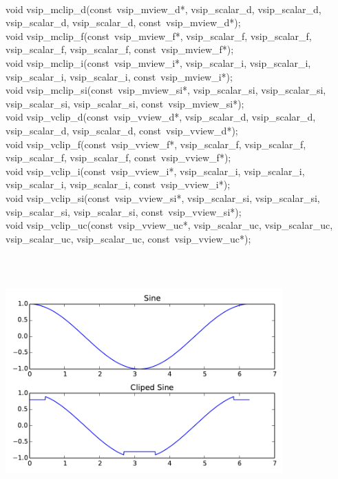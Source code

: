 \\\cvsiplh
\begin{cfuncs}
void vsip\_mclip\_d(const~vsip\_mview\_d*, vsip\_scalar\_d, vsip\_scalar\_d, vsip\_scalar\_d, vsip\_scalar\_d, const~vsip\_mview\_d*);\Bs\\
void vsip\_mclip\_f(const~vsip\_mview\_f*, vsip\_scalar\_f, vsip\_scalar\_f, vsip\_scalar\_f, vsip\_scalar\_f, const~vsip\_mview\_f*);\Bs\\
void vsip\_mclip\_i(const~vsip\_mview\_i*, vsip\_scalar\_i, vsip\_scalar\_i, vsip\_scalar\_i, vsip\_scalar\_i, const~vsip\_mview\_i*);\Bs\\
void vsip\_mclip\_si(const~vsip\_mview\_si*, vsip\_scalar\_si, vsip\_scalar\_si, vsip\_scalar\_si, vsip\_scalar\_si, const~vsip\_mview\_si*);\Bs\\
void vsip\_vclip\_d(const~vsip\_vview\_d*, vsip\_scalar\_d, vsip\_scalar\_d, vsip\_scalar\_d, vsip\_scalar\_d, const~vsip\_vview\_d*);\Bs\\
void vsip\_vclip\_f(const~vsip\_vview\_f*, vsip\_scalar\_f, vsip\_scalar\_f, vsip\_scalar\_f, vsip\_scalar\_f, const~vsip\_vview\_f*);\Bs\\
void vsip\_vclip\_i(const~vsip\_vview\_i*, vsip\_scalar\_i, vsip\_scalar\_i, vsip\_scalar\_i, vsip\_scalar\_i, const~vsip\_vview\_i*);\Bs\\
void vsip\_vclip\_si(const~vsip\_vview\_si*, vsip\_scalar\_si, vsip\_scalar\_si, vsip\_scalar\_si, vsip\_scalar\_si, const~vsip\_vview\_si*);\Bs\\
void vsip\_vclip\_uc(const~vsip\_vview\_uc*, vsip\_scalar\_uc, vsip\_scalar\_uc, vsip\_scalar\_uc, vsip\_scalar\_uc, const~vsip\_vview\_uc*);\Bs\\
\end{cfuncs}
\pyjvsiph
{}
%
\inputminted[linenos=true,resetmargins=true,xleftmargin=.12\textwidth,fontfamily=tt,fontsize=\small]{python}{./pyJvsip_examples/eXclip.py}
\\
\begin{minipage}[c]{\textwidth}\centering\includegraphics[width=0.8\textwidth]{./pyJvsip_examples/eXclip}
\label{fig:ClipExample}\end{minipage}
